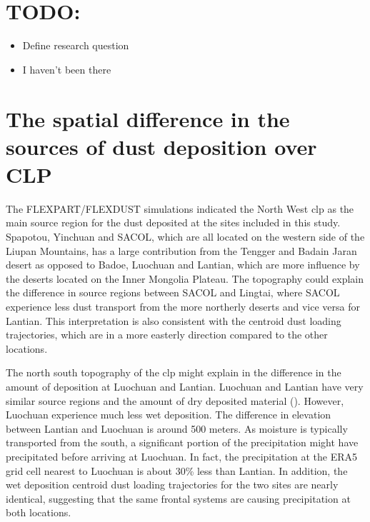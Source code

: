   
\section{TODO:}

\begin{itemize}
    \item Define research question
    \item I haven't been there
\end{itemize}

\section{The spatial difference in the sources of dust deposition over CLP}
The FLEXPART/FLEXDUST simulations indicated the North West \acrshort{clp} as the main source region for the dust deposited at the sites included in this study. Spapotou, Yinchuan and SACOL, which are all located on the western side of the Liupan Mountains, has a large contribution from the Tengger and Badain Jaran desert as opposed to Badoe, Luochuan and Lantian, which are more influence by the deserts located on the Inner Mongolia Plateau. The topography could explain the difference in source regions between SACOL and Lingtai, where SACOL experience less dust transport from the more northerly deserts and vice versa for Lantian. This interpretation is also consistent with the centroid dust loading trajectories, which are in a more easterly direction compared to the other locations. 

The north south topography of the \acrshort{clp} might explain in the difference in the amount of deposition at Luochuan and Lantian. Luochuan and Lantian have very similar source regions and the amount of dry deposited material (). However, Luochuan experience much less wet deposition. The difference in elevation between Lantian and Luochuan is around 500 meters. As moisture is typically transported from the south, a significant portion of the precipitation might have precipitated before arriving at Luochuan. In fact, the precipitation at the ERA5 grid cell nearest to Luochuan is about 30\% less than Lantian. In addition, the wet deposition centroid dust loading trajectories for the two sites are nearly identical, suggesting that the same frontal systems are causing precipitation at both locations.              



